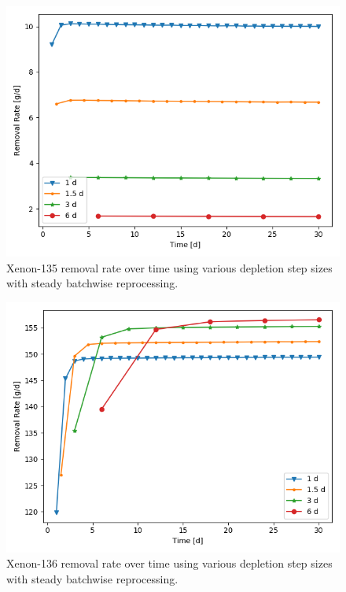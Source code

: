 \begin{figure}[H]
  \centering
  \includegraphics[scale=0.7]{images/waste_Xe135_6d_sp_comp.png}
  \caption{Xenon-135 removal rate over time using various depletion step sizes with steady batchwise reprocessing.}
   \label{fig:steady-batch-xe135-repr}
\end{figure}

\begin{figure}[H]
  \centering
  \includegraphics[scale=0.7]{images/waste_Xe136_6d_sp_comp.png}
  \caption{Xenon-136 removal rate over time using various depletion step sizes with steady batchwise reprocessing.}
   \label{fig:steady-batch-xe136-repr}
\end{figure}

